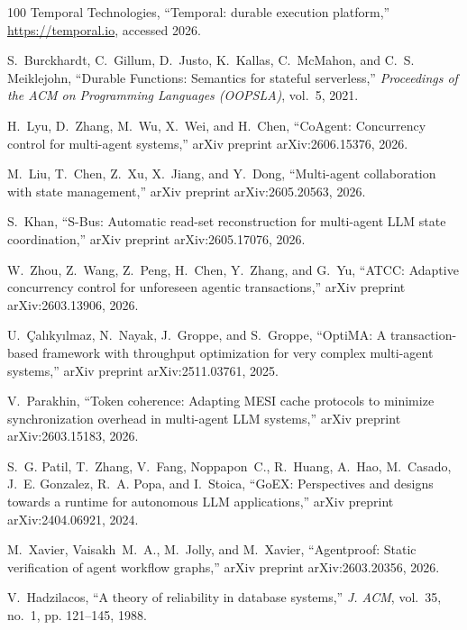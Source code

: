 \begin{thebibliography}{100}
{Temporal Technologies}, ``Temporal: durable execution platform,''
  \url{https://temporal.io}, accessed 2026.

S.~Burckhardt, C.~Gillum, D.~Justo, K.~Kallas, C.~McMahon, and C.~S.
  Meiklejohn, ``Durable Functions: Semantics for stateful serverless,''
  \emph{Proceedings of the ACM on Programming Languages (OOPSLA)},
  vol.~5, 2021.

H.~Lyu, D.~Zhang, M.~Wu, X.~Wei, and H.~Chen, ``{CoAgent}: Concurrency control
  for multi-agent systems,'' arXiv preprint arXiv:2606.15376, 2026.

M.~Liu, T.~Chen, Z.~Xu, X.~Jiang, and Y.~Dong, ``Multi-agent collaboration with
  state management,'' arXiv preprint arXiv:2605.20563, 2026.

S.~Khan, ``{S-Bus}: Automatic read-set reconstruction for multi-agent {LLM}
  state coordination,'' arXiv preprint arXiv:2605.17076, 2026.

W.~Zhou, Z.~Wang, Z.~Peng, H.~Chen, Y.~Zhang, and G.~Yu, ``{ATCC}: Adaptive
  concurrency control for unforeseen agentic transactions,'' arXiv preprint
  arXiv:2603.13906, 2026.

U.~\c{C}al{\i}ky{\i}lmaz, N.~Nayak, J.~Groppe, and S.~Groppe, ``{OptiMA}: A
  transaction-based framework with throughput optimization for very complex
  multi-agent systems,'' arXiv preprint arXiv:2511.03761, 2025.

V.~Parakhin, ``Token coherence: Adapting {MESI} cache protocols to minimize
  synchronization overhead in multi-agent {LLM} systems,'' arXiv preprint
  arXiv:2603.15183, 2026.

S.~G. Patil, T.~Zhang, V.~Fang, Noppapon~C., R.~Huang, A.~Hao, M.~Casado,
  J.~E. Gonzalez, R.~A. Popa, and I.~Stoica, ``{GoEX}: Perspectives and designs
  towards a runtime for autonomous {LLM} applications,'' arXiv preprint
  arXiv:2404.06921, 2024.

M.~Xavier, Vaisakh~M.~A., M.~Jolly, and M.~Xavier, ``{Agentproof}: Static
  verification of agent workflow graphs,'' arXiv preprint arXiv:2603.20356,
  2026.

V.~Hadzilacos, ``A theory of reliability in database systems,'' \emph{J. ACM},
  vol.~35, no.~1, pp. 121--145, 1988.


\end{thebibliography}
